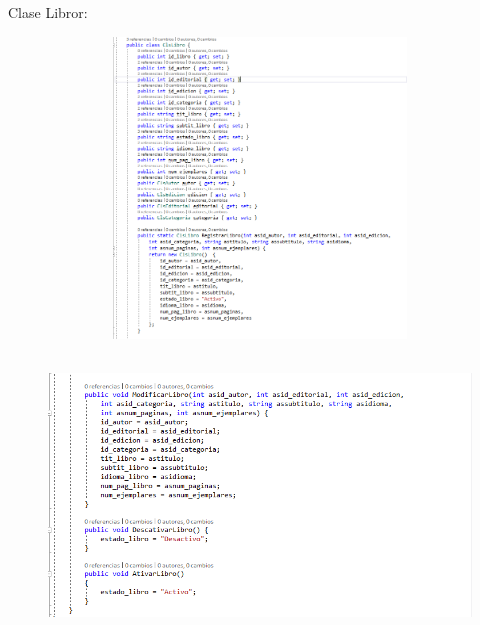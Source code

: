 \documentclass[12pt]{article}
\begin{document}
\begin{enumerate}[label*=\arabic*.]
\begin{enumerate}[label*=\arabic*.]
\newpage
Clase Libror:
\begin{figure}[H]
	\begin{Center}
		\includegraphics[width=4.91in,height=3.15in]{./media/8a.png}
	\end{Center}
	\begin{Center}
		\includegraphics[width=4.91in,height=3.15in]{./media/8b.png}
	\end{Center}
\end{figure}


\end{enumerate}
\end{enumerate}
\end{document}
